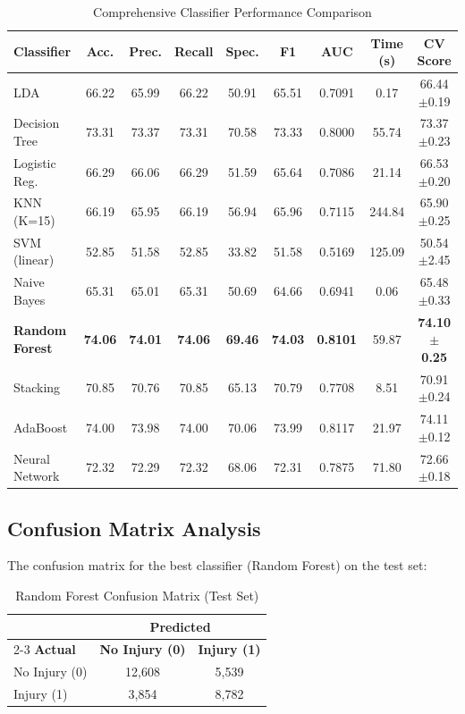 \documentclass[12pt,man]{apa7}
\begin{document}
\begin{table}[H]
\centering
\caption{Comprehensive Classifier Performance Comparison}
\scriptsize
\begin{tabular}{lcccccccc}
\toprule
\textbf{Classifier} & \textbf{Acc.} & \textbf{Prec.} & \textbf{Recall} & \textbf{Spec.} & \textbf{F1} & \textbf{AUC} & \textbf{Time (s)} & \textbf{CV Score} \\
\midrule
LDA & 66.22 & 65.99 & 66.22 & 50.91 & 65.51 & 0.7091 & 0.17 & 66.44$\pm$0.19 \\
Decision Tree & 73.31 & 73.37 & 73.31 & 70.58 & 73.33 & 0.8000 & 55.74 & 73.37$\pm$0.23 \\
Logistic Reg. & 66.29 & 66.06 & 66.29 & 51.59 & 65.64 & 0.7086 & 21.14 & 66.53$\pm$0.20 \\
KNN (K=15) & 66.19 & 65.95 & 66.19 & 56.94 & 65.96 & 0.7115 & 244.84 & 65.90$\pm$0.25 \\
SVM (linear) & 52.85 & 51.58 & 52.85 & 33.82 & 51.58 & 0.5169 & 125.09 & 50.54$\pm$2.45 \\
Naive Bayes & 65.31 & 65.01 & 65.31 & 50.69 & 64.66 & 0.6941 & 0.06 & 65.48$\pm$0.33 \\
\textbf{Random Forest} & \textbf{74.06} & \textbf{74.01} & \textbf{74.06} & \textbf{69.46} & \textbf{74.03} & \textbf{0.8101} & 59.87 & \textbf{74.10$\pm$0.25} \\
Stacking & 70.85 & 70.76 & 70.85 & 65.13 & 70.79 & 0.7708 & 8.51 & 70.91$\pm$0.24 \\
AdaBoost & 74.00 & 73.98 & 74.00 & 70.06 & 73.99 & 0.8117 & 21.97 & 74.11$\pm$0.12 \\
Neural Network & 72.32 & 72.29 & 72.32 & 68.06 & 72.31 & 0.7875 & 71.80 & 72.66$\pm$0.18 \\
\bottomrule
\end{tabular}
\end{table}

\subsection{Confusion Matrix Analysis}

The confusion matrix for the best classifier (Random Forest) on the test set:

\begin{table}[H]
\centering
\caption{Random Forest Confusion Matrix (Test Set)}
\begin{tabular}{lcc}
\toprule
& \multicolumn{2}{c}{\textbf{Predicted}} \\
\cmidrule(lr){2-3}
\textbf{Actual} & \textbf{No Injury (0)} & \textbf{Injury (1)} \\
\midrule
No Injury (0) & 12,608 & 5,539 \\
Injury (1) & 3,854 & 8,782 \\
\bottomrule
\end{tabular}
\end{table}
\end{document}
